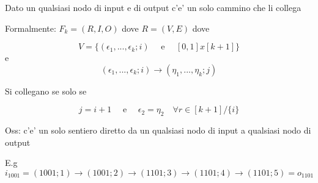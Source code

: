 \documentclass{article}
\begin{document}
        \begin{flushleft}
          Dato un qualsiasi nodo di input e di output c'e' un solo cammino che li collega
        \end{flushleft}
        \begin{flushleft}
          Formalmente: $F_k=(R,I,O)$ dove $R=(V,E)$ dove 
        \end{flushleft}
        \begin{equation*}
          V=\{(\epsilon_1,...,\epsilon_k;i) \quad \text{ e } \quad [0,1]x[k+1]\}
        \end{equation*}
        e
        \begin{equation*}
          (\epsilon_1,...,\epsilon_k;i) \to (\eta_1,...,\eta_k;j)
        \end{equation*}
        \begin{flushleft}
          Si collegano se solo se
        \end{flushleft}
        \begin{equation*}
          j=i+1 \quad \text{ e } \quad \epsilon_2=\eta_2 \quad \forall r\in [k+1] / \{i\}
        \end{equation*}
        \begin{flushleft}
          Oss: c'e' un solo sentiero diretto da un qualsiasi nodo di input a qualsiasi nodo di output
        \end{flushleft}
        E.g
        \begin{equation*}
          i_{1001}=(1001;1)\to (1001;2) \to (1101;3) \to (1101;4) \to (1101;5)=o_{1101}
        \end{equation*}
\end{document}
